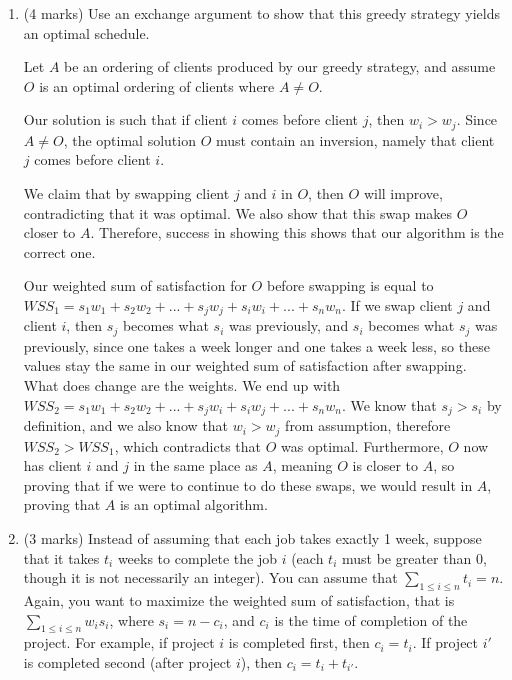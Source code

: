 \documentclass[11pt]{article}
\begin{document}
\begin{enumerate}
    \item (4 marks)
    Use an exchange argument to show that this greedy strategy yields an optimal schedule. 
    
    \begin{soln}
    Let $A$ be an ordering of clients produced by our greedy strategy, and assume $O$ is an optimal ordering of clients where $A \neq O$.
    
    Our solution is such that if client $i$ comes before client $j$, then $w_i > w_j$. Since $A \neq O$, the optimal solution $O$ must contain an inversion, namely that client $j$ comes before client $i$.
    
    We claim that by swapping client $j$ and $i$ in $O$, then $O$ will improve, contradicting that it was optimal. We also show that this swap makes $O$ closer to $A$. Therefore, success in showing this shows that our algorithm is the correct one.
    
    Our weighted sum of satisfaction for $O$ before swapping is equal to $WSS_1 = s_1w_1 + s_2w_2 + ... + s_jw_j + s_iw_i + ... + s_nw_n$. If we swap client $j$ and client $i$, then $s_j$ becomes what $s_i$ was previously, and $s_i$ becomes what $s_j$ was previously, since one takes a week longer and one takes a week less, so these values stay the same in our weighted sum of satisfaction after swapping. What does change are the weights. We end up with $WSS_2 = s_1w_1 + s_2w_2 + ... + s_jw_i + s_iw_j + ... + s_nw_n$. We know that $s_j > s_i$ by definition, and we also know that $w_i > w_j$ from assumption, therefore $WSS_2 > WSS_1$, which contradicts that $O$ was optimal. Furthermore, $O$ now has client $i$ and $j$ in the same place as $A$, meaning $O$ is closer to $A$, so proving that if we were to continue to do these swaps, we would result in $A$, proving that $A$ is an optimal algorithm.
    \end{soln}
    
  \item \label{variant}
    (3 marks) Instead of assuming that each job takes exactly 1 week, suppose that it takes $t_i$ weeks to complete the job $i$ (each $t_i$ must be greater than 0, though it is not necessarily an integer). You can assume that $\sum_{1\le i \le n} t_i = n$. Again, you want to maximize the weighted sum of satisfaction, that is $\sum_{1 \le i \le n} w_i s_i$, where $s_i = n - c_i$, and $c_i$ is the time of completion of the project. For example, if project $i$ is completed first, then $c_i = t_i$. If project $i'$ is completed second (after project $i$), then $c_i = t_i + t_{i'}$. 
    

\end{enumerate}
\end{document}
